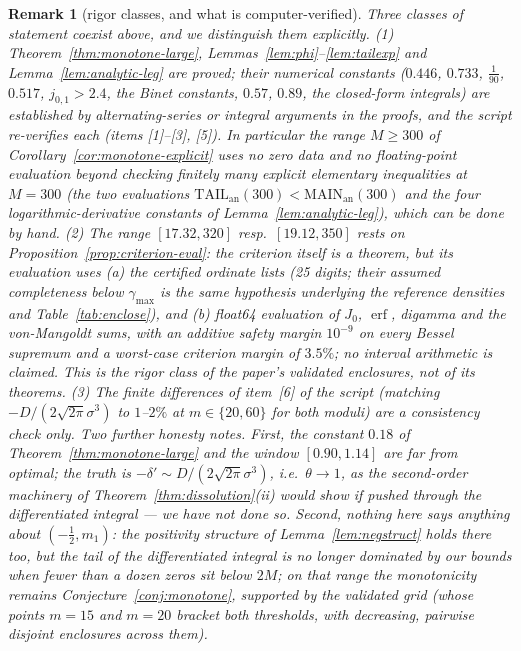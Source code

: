 \documentclass[11pt]{article}
\newtheorem{remark}{Remark}
\begin{document}
\begin{remark}[rigor classes, and what is computer-verified]
\label{rem:monotone-rigor}
Three classes of statement coexist above, and we distinguish them
explicitly. (1) Theorem~\ref{thm:monotone-large},
Lemmas~\ref{lem:phi}--\ref{lem:tailexp} and
Lemma~\ref{lem:analytic-leg} are proved; their numerical constants
($0.446$, $0.733$, $\tfrac1{90}$, $0.517$, $j_{0,1}>2.4$, the Binet
constants, $0.57$, $0.89$, the closed-form integrals) are established
by alternating-series or integral arguments in the proofs, and the
script re-verifies each (items [1]--[3], [5]). In particular the
range $M\ge300$ of Corollary~\ref{cor:monotone-explicit} uses no zero
data and no floating-point evaluation beyond checking finitely many
explicit elementary inequalities at $M=300$ (the two evaluations
$\mathrm{TAIL}_{\mathrm{an}}(300)<\mathrm{MAIN}_{\mathrm{an}}(300)$
and the four logarithmic-derivative constants of
Lemma~\ref{lem:analytic-leg}), which can be done by hand.
(2) The range $[17.32,320]$ resp.\ $[19.12,350]$ rests on
Proposition~\ref{prop:criterion-eval}: the criterion itself is a
theorem, but its evaluation uses (a) the certified ordinate lists
(25 digits; their assumed completeness below $\gamma_{\max}$ is the
same hypothesis underlying the reference densities and
Table~\ref{tab:enclose}), and (b) float64 evaluation of $J_0$,
$\operatorname{erf}$, digamma and the von-Mangoldt sums, with an
additive safety margin $10^{-9}$ on every Bessel supremum and a
worst-case criterion margin of $3.5\%$; no interval arithmetic is
claimed. This is the rigor class of the paper's validated enclosures,
not of its theorems. (3) The finite differences of item~[6] of the
script (matching $-D/(2\sqrt{2\pi}\sigma^3)$ to $1$--$2\%$ at
$m\in\{20,60\}$ for both moduli) are a consistency check only.
Two further honesty notes. First, the constant $0.18$ of
Theorem~\ref{thm:monotone-large} and the window $[0.90,1.14]$ are
far from optimal; the truth is
$-\delta'\sim D/(2\sqrt{2\pi}\sigma^3)$, i.e.\ $\theta\to1$, as the
second-order machinery of Theorem~\ref{thm:dissolution}(ii) would
show if pushed through the differentiated integral --- we have not
done so. Second, nothing here says anything about
$(-\tfrac12,m_1)$: the positivity structure of
Lemma~\ref{lem:negstruct} holds there too, but the tail of the
differentiated integral is no longer dominated by our bounds when
fewer than a dozen zeros sit below $2M$; on that range the
monotonicity remains Conjecture~\ref{conj:monotone}, supported by the
validated grid (whose points $m=15$ and $m=20$ bracket both
thresholds, with decreasing, pairwise disjoint enclosures across
them).
\end{remark}
\end{document}
